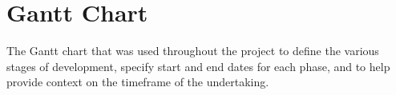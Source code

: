 \chapter{Gantt Chart}
\label{Gantt Chart}

The Gantt chart that was used throughout the project to define the various stages of development, specify start and end dates for each phase, and to help provide context on the timeframe of the undertaking.

